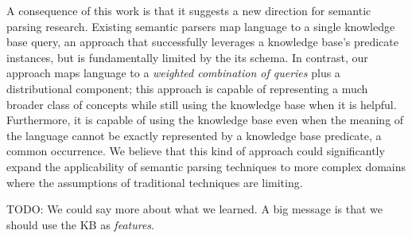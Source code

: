 \documentclass[11pt]{article}
\begin{document}
A consequence of this work is that it suggests a new direction for
semantic parsing research. Existing semantic parsers map language to a
single knowledge base query, an approach that successfully leverages a
knowledge base's predicate instances, but is fundamentally limited by
the its schema. In contrast, our approach maps language to a
\emph{weighted combination of queries} plus a distributional
component; this approach is capable of representing a much broader
class of concepts while still using the knowledge base when it is
helpful. Furthermore, it is capable of using the knowledge base even
when the meaning of the language cannot be exactly represented by a
knowledge base predicate, a common occurrence. We believe that this
kind of approach could significantly expand the applicability of
semantic parsing techniques to more complex domains where the
assumptions of traditional techniques are limiting.


TODO: We could say more about what we learned. A big message is that
we should use the KB as \emph{features}.





\end{document}
